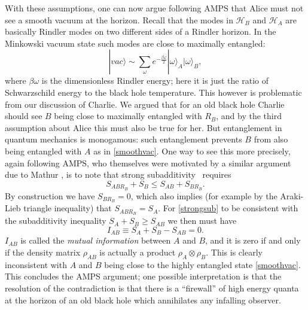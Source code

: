 \documentclass[12pt]{article}
\newcommand{\be}{\begin{equation}}
\newcommand{\ee}{\end{equation}}
\newcommand{\HA}{\mathcal{H}_A}
\newcommand{\HB}{\mathcal{H}_B}
\newcommand{\ran}{\rangle}
\begin{document}
With these assumptions, one can now argue following AMPS that Alice must not see a smooth vacuum at the horizon.  Recall that the modes in $\HB$ and $\HA$ are basically Rindler modes on two different sides of a Rindler horizon.  In the Minkowski vacuum state such modes are close to maximally entangled:
\be\label{smoothvac}
|vac\ran\sim\sum_\omega e^{-\frac{\beta\omega}{2}}|\omega\ran_A|\omega\ran_B,
\ee
where $\beta\omega$ is the dimensionless Rindler energy; here it is just the ratio of Schwarzschild energy to the black hole temperature.  This however is problematic from our discussion of Charlie.  We argued that for an old black hole Charlie should see $B$ being close to maximally entangled with $R_B$, and by the third assumption about Alice this must also be true for her.  But entanglement in quantum mechanics is monogamous: such entanglement prevents $B$ from also being entangled with $A$ as in \eqref{smoothvac}.  One way to see this more precisely, again following AMPS, who themselves were motivated by a similar argument due to Mathur \cite{Mathur:2009hf}, is to note that strong subadditivity~\cite{lieb1973proof} requires
\be\label{strongsub}
S_{ABR_B}+S_B\leq S_{AB}+S_{BR_B}.
\ee
By construction we have $S_{BR_B}=0$, which also implies (for example by the Araki-Lieb triangle inequality) that $S_{ABR_B}=S_A$.  For \eqref{strongsub} to be consistent with the subadditivity inequality $S_A+S_B\geq S_{AB}$ we then must have
\be
I_{AB}\equiv S_A+S_B-S_{AB}=0.
\ee 
$I_{AB}$ is called the \textit{mutual information} between $A$ and $B$, and it is zero if and only if the density matrix $\rho_{AB}$ is actually a product $\rho_A\otimes \rho_B$.  This is clearly inconsistent with $A$ and $B$ being close to the highly entangled state \eqref{smoothvac}.  This concludes the AMPS argument; one possible interpretation is that the resolution of the contradiction is that there is a ``firewall'' of high energy quanta at the horizon of an old black hole which annihilates any infalling observer.
\end{document}
